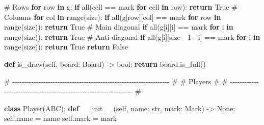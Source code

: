 \documentclass[11pt]{article}
\newenvironment{Shaded}{\begin{snugshade}}{\end{snugshade}}
\newcommand{\BuiltInTok}[1]{\textcolor[rgb]{0.50,0.55,0.55}{#1}}
\newcommand{\CommentTok}[1]{\textcolor[rgb]{0.48,0.49,0.49}{#1}}
\newcommand{\ControlFlowTok}[1]{\textcolor[rgb]{0.99,0.74,0.29}{\textbf{#1}}}
\newcommand{\DecValTok}[1]{\textcolor[rgb]{0.96,0.45,0.00}{#1}}
\newcommand{\FunctionTok}[1]{\textcolor[rgb]{0.56,0.27,0.68}{#1}}
\newcommand{\KeywordTok}[1]{\textcolor[rgb]{0.81,0.81,0.76}{\textbf{#1}}}
\newcommand{\NormalTok}[1]{\textcolor[rgb]{0.81,0.81,0.76}{#1}}
\newcommand{\OperatorTok}[1]{\textcolor[rgb]{0.81,0.81,0.76}{#1}}
\newcommand{\VariableTok}[1]{\textcolor[rgb]{0.15,0.68,0.68}{#1}}
\begin{document}
\begin{Shaded}
\begin{Highlighting}[]
        \CommentTok{\# Rows}
        \ControlFlowTok{for}\NormalTok{ row }\KeywordTok{in}\NormalTok{ g:}
            \ControlFlowTok{if} \BuiltInTok{all}\NormalTok{(cell }\OperatorTok{==}\NormalTok{ mark }\ControlFlowTok{for}\NormalTok{ cell }\KeywordTok{in}\NormalTok{ row):}
                \ControlFlowTok{return} \VariableTok{True}
        \CommentTok{\# Columns}
        \ControlFlowTok{for}\NormalTok{ col }\KeywordTok{in} \BuiltInTok{range}\NormalTok{(size):}
            \ControlFlowTok{if} \BuiltInTok{all}\NormalTok{(g[row][col] }\OperatorTok{==}\NormalTok{ mark }\ControlFlowTok{for}\NormalTok{ row }\KeywordTok{in} \BuiltInTok{range}\NormalTok{(size)):}
                \ControlFlowTok{return} \VariableTok{True}
        \CommentTok{\# Main diagonal}
        \ControlFlowTok{if} \BuiltInTok{all}\NormalTok{(g[i][i] }\OperatorTok{==}\NormalTok{ mark }\ControlFlowTok{for}\NormalTok{ i }\KeywordTok{in} \BuiltInTok{range}\NormalTok{(size)):}
            \ControlFlowTok{return} \VariableTok{True}
        \CommentTok{\# Anti{-}diagonal}
        \ControlFlowTok{if} \BuiltInTok{all}\NormalTok{(g[i][size }\OperatorTok{{-}} \DecValTok{1} \OperatorTok{{-}}\NormalTok{ i] }\OperatorTok{==}\NormalTok{ mark }\ControlFlowTok{for}\NormalTok{ i }\KeywordTok{in} \BuiltInTok{range}\NormalTok{(size)):}
            \ControlFlowTok{return} \VariableTok{True}
        \ControlFlowTok{return} \VariableTok{False}

    \KeywordTok{def}\NormalTok{ is\_draw(}\VariableTok{self}\NormalTok{, board: Board) }\OperatorTok{{-}\textgreater{}} \BuiltInTok{bool}\NormalTok{:}
        \ControlFlowTok{return}\NormalTok{ board.is\_full()}


\CommentTok{\# {-}{-}{-}{-}{-}{-}{-}{-}{-}{-}{-}{-}{-}{-}{-}{-}{-}{-}{-}{-}{-}{-}{-}{-}{-}{-}{-}{-}{-}{-}{-}{-}{-}{-}{-}{-}{-}{-}{-}{-}{-}{-}{-}{-}{-}{-}{-}{-}{-}{-}{-}{-}{-}{-}{-}{-}{-}{-}{-}{-}{-}{-}{-}{-}{-}{-} \#}
\CommentTok{\# Players                                                             \#}
\CommentTok{\# {-}{-}{-}{-}{-}{-}{-}{-}{-}{-}{-}{-}{-}{-}{-}{-}{-}{-}{-}{-}{-}{-}{-}{-}{-}{-}{-}{-}{-}{-}{-}{-}{-}{-}{-}{-}{-}{-}{-}{-}{-}{-}{-}{-}{-}{-}{-}{-}{-}{-}{-}{-}{-}{-}{-}{-}{-}{-}{-}{-}{-}{-}{-}{-}{-}{-} \#}

\KeywordTok{class}\NormalTok{ Player(ABC):}
    \KeywordTok{def} \FunctionTok{\_\_init\_\_}\NormalTok{(}\VariableTok{self}\NormalTok{, name: }\BuiltInTok{str}\NormalTok{, mark: Mark) }\OperatorTok{{-}\textgreater{}} \VariableTok{None}\NormalTok{:}
        \VariableTok{self}\NormalTok{.name }\OperatorTok{=}\NormalTok{ name}
        \VariableTok{self}\NormalTok{.mark }\OperatorTok{=}\NormalTok{ mark}


\end{Highlighting}
\end{Shaded}
\end{document}
